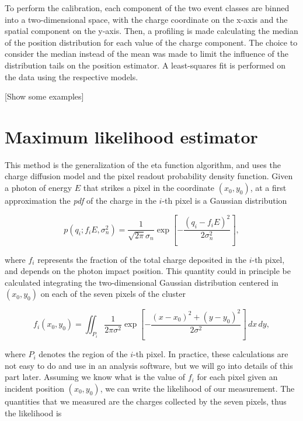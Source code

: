 To perform the calibration, each component of the two event classes are binned into a two-dimensional space, with the charge coordinate on the x-axis and the spatial component on the y-axis. Then, a profiling is made calculating the median of the position distribution for each value of the charge component. The choice to consider the median instead of the mean was made to limit the influence of the distribution tails on the position estimator. A least-squares fit is performed on the data using the respective models.

[Show some examples]



\section{Maximum likelihood estimator}
This method is the generalization of the eta function algorithm, and uses the charge diffusion model and  the pixel readout probability density function. Given a photon of energy $E$ that strikes a pixel in the coordinate $(x_0, y_0)$, at a first approximation the \textit{pdf} of the charge in the $i$-th pixel is a Gaussian distribution

\begin{equation}
p(q_i; f_i E , \sigma^2_n) = \frac{1}{\sqrt{2\pi}\sigma_n} \exp \left[- \frac{(q_i - f_i E)^2}{2\sigma_n^2} \right],
\label{eq:pdf_gauss}
\end{equation}

where $f_i$ represents the fraction of the total charge deposited in the $i$-th pixel, and depends on the photon impact position. This quantity could in principle be calculated integrating the two-dimensional Gaussian distribution centered in $(x_0, y_0)$ on each of the seven pixels of the cluster

\begin{equation}
f_i (x_0, y_0) = \iint_{P_i} \frac{1}{2\pi \sigma^2} \exp \left[ - \frac{(x - x_0)^2 + (y - y_0)^2}{2\sigma^2} \right] \,dx\,dy,
\end{equation}

where $P_i$ denotes the region of the $i$-th pixel. In practice, these calculations are not easy to do and use in an analysis software, but we will go into details of this part later. Assuming we know what is the value of $f_i$ for each pixel given an incident position $(x_0, y_0)$, we can write the likelihood of  our measurement. The quantities that we measured are the charges collected by the seven pixels, thus the likelihood is


